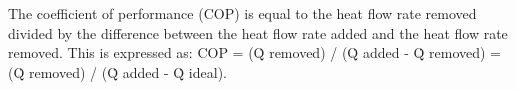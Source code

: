 The coefficient of performance (COP) is equal to the heat flow rate removed divided by the difference between the heat flow rate added and the heat flow rate removed. This is expressed as:  
COP = (Q̇ removed) / (Q̇ added - Q̇ removed) = (Q̇ removed) / (Q̇ added - Q̇ ideal).